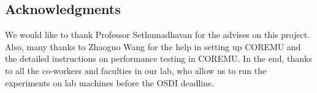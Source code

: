 \subsection*{Acknowledgments}

We would like to thank Professor Sethumadhavan for the advises on this project.
Also, many thanks to Zhaoguo Wang for the help in setting up COREMU and the 
detailed instructions on performance testing in COREMU. In the end, thanks to
all the co-workers and faculties in our lab, who allow us to run the experiments
on lab machines before the OSDI deadline.


